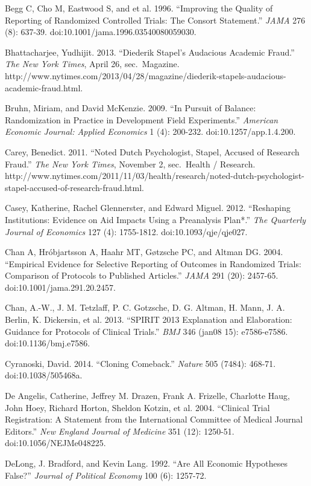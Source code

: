 \documentclass[12pt] {article}
\begin{document}
Begg C, Cho M, Eastwood S, and et al. 1996. ``Improving the Quality of
Reporting of Randomized Controlled Trials: The Consort Statement.''
\emph{JAMA} 276 (8): 637-39. doi:10.1001/jama.1996.03540080059030.

Bhattacharjee, Yudhijit. 2013. ``Diederik Stapel's Audacious Academic
Fraud.'' \emph{The New York Times}, April 26, sec.~Magazine.
http://www.nytimes.com/2013/04/28/magazine/diederik-stapels-audacious-academic-fraud.html.

Bruhn, Miriam, and David McKenzie. 2009. ``In Pursuit of Balance:
Randomization in Practice in Development Field Experiments.''
\emph{American Economic Journal: Applied Economics} 1 (4): 200-232.
doi:10.1257/app.1.4.200.

Carey, Benedict. 2011. ``Noted Dutch Psychologist, Stapel, Accused of
Research Fraud.'' \emph{The New York Times}, November 2, sec.~Health /
Research.
http://www.nytimes.com/2011/11/03/health/research/noted-dutch-psychologist-stapel-accused-of-research-fraud.html.

Casey, Katherine, Rachel Glennerster, and Edward Miguel. 2012.
``Reshaping Institutions: Evidence on Aid Impacts Using a Preanalysis
Plan*.'' \emph{The Quarterly Journal of Economics} 127 (4): 1755-1812.
doi:10.1093/qje/qje027.

Chan A, Hróbjartsson A, Haahr MT, Gøtzsche PC, and Altman DG. 2004.
``Empirical Evidence for Selective Reporting of Outcomes in Randomized
Trials: Comparison of Protocols to Published Articles.'' \emph{JAMA} 291
(20): 2457-65. doi:10.1001/jama.291.20.2457.

Chan, A.-W., J. M. Tetzlaff, P. C. Gotzsche, D. G. Altman, H. Mann, J.
A. Berlin, K. Dickersin, et al. 2013. ``SPIRIT 2013 Explanation and
Elaboration: Guidance for Protocols of Clinical Trials.'' \emph{BMJ} 346
(jan08 15): e7586-e7586. doi:10.1136/bmj.e7586.

Cyranoski, David. 2014. ``Cloning Comeback.'' \emph{Nature} 505 (7484):
468-71. doi:10.1038/505468a.

De Angelis, Catherine, Jeffrey M. Drazen, Frank A. Frizelle, Charlotte
Haug, John Hoey, Richard Horton, Sheldon Kotzin, et al. 2004. ``Clinical
Trial Registration: A Statement from the International Committee of
Medical Journal Editors.'' \emph{New England Journal of Medicine} 351
(12): 1250-51. doi:10.1056/NEJMe048225.

DeLong, J. Bradford, and Kevin Lang. 1992. ``Are All Economic Hypotheses
False?'' \emph{Journal of Political Economy} 100 (6): 1257-72.
\end{document}
